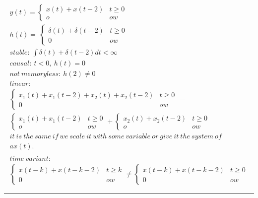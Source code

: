 \documentclass{article}[12pt]
\begin{document}
\begin{equation}
	\begin{gathered}
			y( t) =\begin{cases}
				x( t) +x( t-2) & t\geqslant 0\\
				o & ow
			\end{cases}\\
			h( t) =\ \begin{cases}
				\delta ( t) +\delta ( t-2) & t\geqslant 0\\
				0 & ow
			\end{cases}\\
			stable:\ \int \delta ( t) +\delta ( t-2) dt< \infty \\
			causal:\ t< 0,\ h( t) =0\\
			not\ memoryless:\ h( 2) \neq 0\\
			linear:\ \\
			\begin{cases}
				x_{1}( t) +x_{1}( t-2) +x_{2}( t) +x_{2}( t-2) & t\geqslant 0\\
				0 & ow
			\end{cases} =\\
			\begin{cases}
				x_{1}( t) +x_{1}( t-2) & t\geqslant 0\\
				o & ow
			\end{cases} +\begin{cases}
				x_{2}( t) +x_{2}( t-2) & t\geqslant 0\\
				o & ow
			\end{cases}\\
			it\ is\ the\ same\ if\ we\ scale\ it\ with\ some\ variable\ or\ give\ it\ the\ system\ of\ \\
			ax( t) .\ \\
			\\
			time\ variant:\\
			\begin{cases}
				x( t-k) +x( t-k-2) & t\geqslant k\\
				0 & ow
			\end{cases} \neq \begin{cases}
				x( t-k) +x( t-k-2) & t\geqslant 0\\
				0 & ow
			\end{cases}
	\end{gathered}
\end{equation}
\hrule
\end{document}
